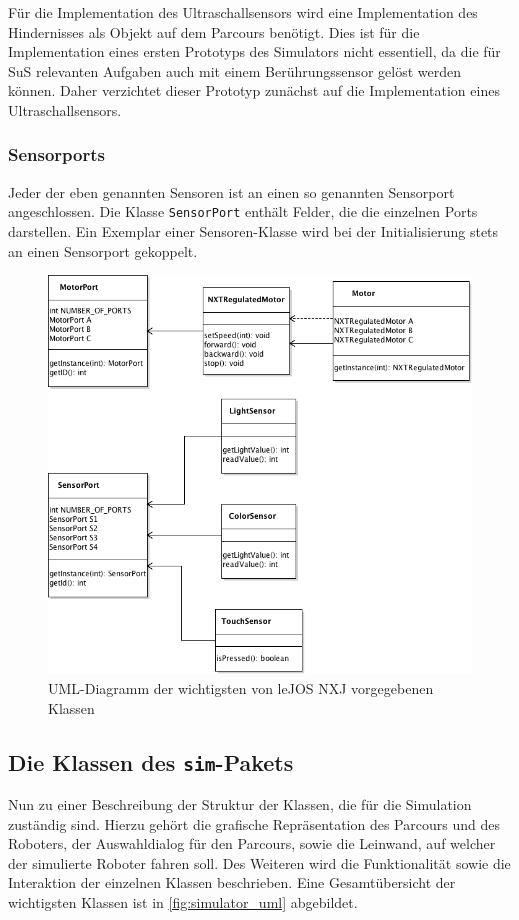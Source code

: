 \documentclass[paper=a4, DIV=calc, BCOR=12mm, twoside=on, onecolumn=on, open = right, titlepage =on, parskip =half-, headsepline = on, footsepline = off, chapterprefix = off, appendixprefix = on, fontsize = 12pt, numbers = noenddot, abstract = on]{scrbook}
\begin{document}
Für die Implementation des Ultraschallsensors wird eine Implementation des Hindernisses als Objekt auf dem Parcours benötigt. Dies ist für die Implementation eines ersten Prototyps des Simulators nicht essentiell, da die für SuS relevanten Aufgaben auch mit einem Berührungssensor gelöst werden können. Daher verzichtet dieser Prototyp zunächst auf die Implementation eines Ultraschallsensors.

\subsubsection{Sensorports}
Jeder der eben genannten Sensoren ist an einen so genannten Sensorport angeschlossen. Die Klasse \texttt{SensorPort} enthält Felder, die die einzelnen Ports darstellen. Ein Exemplar einer Sensoren-Klasse wird bei der Initialisierung stets an einen Sensorport gekoppelt. 
\clearpage


\begin{figure}[H]
\centering
\hspace{-3.5cm}\includegraphics[scale=0.68]{images/uml_api_essenz.png}
\caption[UML-Diagramm der Klassen im \texttt{nxt}-Paket]{UML-Diagramm der wichtigsten von leJOS NXJ vorgegebenen Klassen}
\label{fig:api_uml}
\end{figure}


\par \singlespacing
\subsection{Die Klassen des \texttt{sim}-Pakets}
\onehalfspacing
Nun zu einer Beschreibung der Struktur der Klassen, die für die Simulation zuständig sind. Hierzu gehört die grafische Repräsentation des Parcours und des Roboters, der Auswahldialog für den Parcours, sowie die Leinwand, auf welcher der simulierte Roboter fahren soll. Des Weiteren wird die Funktionalität sowie die Interaktion der einzelnen Klassen beschrieben. Eine Gesamtübersicht der wichtigsten Klassen ist in \ref{fig:simulator_uml} abgebildet.
\end{document}
